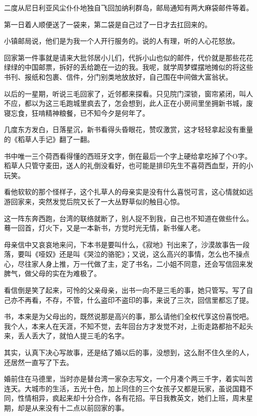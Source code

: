 \par 二度从尼日利亚风尘仆仆地独自飞回加纳利群岛，邮局通知有两大麻袋邮件等着。
\par 第一日着人顺便送了一袋来，第二袋是自己过了一日才去扛回来的。
\par 小镇邮局说，他们是为我一个人开行服务的。说的人有理，听的人心花怒放。
\par 回家第一件事就是请来大批邻居小儿们，代拆小山也似的邮件，代价就是那些花花绿绿的中国邮票，拆好的丢给跪在一边的我。我呢，就学周梦蝶摆地摊似的将这些书刊、报纸和包裹、信件，分门别类地放放好，自己围在中间做大富翁状。
\par 以后的一星期，听说三毛回家了，近邻都来探看。只见院门深锁，窗帘紧闭，叫人不应，都以为这三毛跑城里疯去了，怎会想到，此人正在小房间里坐拥新书城，废寝忘食，狂啃精神粮餐，已不知今夕是何年了。
\par 几度东方发白，日落星沉，新书看得头昏眼花，赞叹激赏，这才轻轻拿起没有重量的《稻草人手记》翻了一翻。
\par 书中唯一三个荷西看得懂的西班牙文字，倒在最后一个字上硬给拿吃掉了个O字。稻草人只管守麦田，送人的礼倒没看好，也可能是排印先生不喜荷西血型，开的小玩笑。
\par 看他软软的那个怪样子，这个扎草人的母亲实是没有什么喜悦可言，这心情就如远游回家来，突然发觉后院又长了一大丛野草似的触目心惊。
\par 这一阵东奔西跑，台湾的联络就断了，别人捉不到我，自己也不知道在做些什么。蓦一回首，灯火下，又是一本新书，方觉时光无情，新书催人老。
\par 母亲信中又哀哀地来问，下本书是要叫什么，《寂地》刊出来了，沙漠故事告一段落，要叫《哑奴》还是叫《哭泣的骆驼》；又说，这么高兴的事情，怎么也不操点心，尽往家人身上推，万一代做了主，定了书名，二小姐不同意，还会写信回来发脾气，做父母的实在为难极了。
\par 看信倒是笑了起来，可怜的父亲母亲，出书一向不是三毛的事，她只管写。写了自己亦不再看，不存，不管，什么盗印不盗印的事，来说了三次，回信里都忘了提。
\par 书，本来是为父母出的，既然说那是高兴的事，那么请他们全权代享这份喜悦吧。我个人，本来人在天涯，不知不觉，去年回台方才发觉不对，上街走路都抬不起头来，丢人丢大了，就怕人提三毛的名字。
\par 其实，认真下决心写故事，还是结了婚以后的事，没想到，这么耐不住久坐的人，还居然一直写了下去。
\par 婚前住在马德里，当时亦是替台湾一家杂志写文，一个月凑个两三千字，着实叫苦连天。大城市的生活，五光十色，加上同住的三个女孩子又都是玩家，虽说国籍不同，性情相异，疯起来却十分合作，各有花招。平日我教英文，她们上班，周末星期，却是从来没有十二点以前回家的事。
